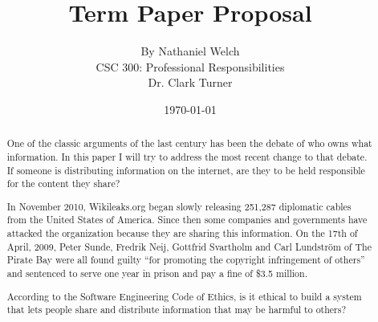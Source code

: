 \documentclass[11pt]{article}
\begin{document}
\title{\vfill Term Paper Proposal} %
\author{
By Nathaniel Welch\vspace{10pt}\\
CSC 300: Professional Responsibilities\vspace{10pt}\\
Dr. Clark Turner\vspace{10pt}\\
}
\date{\today}

\maketitle

\vfill %
\begin{abstract}

One of the classic arguments of the last century has been the debate of who owns what information. In this paper I will try to address the most recent change to that debate. If someone is distributing information on the internet, are they to be held responsible for the content they share?

In November 2010, Wikileaks.org began slowly releasing 251,287 diplomatic cables from the United States of America. \cite{cablegate} Since then some companies and governments have attacked the organization because they are sharing this information. On the 17th of April, 2009, Peter Sunde, Fredrik Neij, Gottfrid Svartholm and Carl Lundström of The Pirate Bay were all found guilty ``for promoting the copyright infringement of others'' and sentenced to serve one year in prison and pay a fine of \$3.5 million. \cite{tpbverdict}

According to the Software Engineering Code of Ethics, is it ethical to build a system that lets people share and distribute information that may be harmful to others?
\end{abstract}

\thispagestyle{empty} %
\newpage

\end{document}
